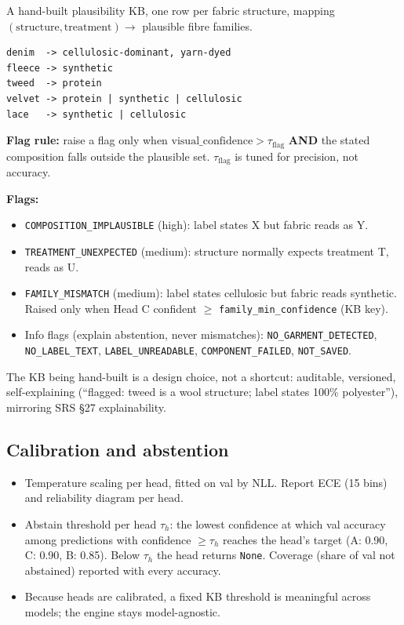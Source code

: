 \documentclass[11pt,a4paper]{article}
\begin{document}
A hand-built plausibility KB, one row per fabric structure, mapping
$(\text{structure}, \text{treatment}) \to$ plausible fibre families.

\begin{verbatim}
denim  -> cellulosic-dominant, yarn-dyed
fleece -> synthetic
tweed  -> protein
velvet -> protein | synthetic | cellulosic
lace   -> synthetic | cellulosic
\end{verbatim}

\textbf{Flag rule:} raise a flag only when $\text{visual\_confidence} > \tau_{\text{flag}}$
\textbf{AND} the stated composition falls outside the plausible set. $\tau_{\text{flag}}$
is tuned for precision, not accuracy.

\textbf{Flags:}
\begin{itemize}[leftmargin=*]
  \item \texttt{COMPOSITION\_IMPLAUSIBLE} (high): label states X but fabric reads as Y.
  \item \texttt{TREATMENT\_UNEXPECTED} (medium): structure normally expects treatment T, reads as U.
  \item \texttt{FAMILY\_MISMATCH} (medium): label states cellulosic but fabric reads synthetic.
        Raised only when Head C confident $\ge$ \texttt{family\_min\_confidence} (KB key).
  \item Info flags (explain abstention, never mismatches): \texttt{NO\_GARMENT\_DETECTED},
        \texttt{NO\_LABEL\_TEXT}, \texttt{LABEL\_UNREADABLE}, \texttt{COMPONENT\_FAILED},
        \texttt{NOT\_SAVED}.
\end{itemize}

The KB being hand-built is a design choice, not a shortcut: auditable, versioned,
self-explaining (``flagged: tweed is a wool structure; label states 100\%
polyester''), mirroring SRS \S 27 explainability.

\subsection{Calibration and abstention}

\begin{itemize}[leftmargin=*]
  \item Temperature scaling per head, fitted on val by NLL. Report ECE (15 bins) and
        reliability diagram per head.
  \item Abstain threshold per head $\tau_h$: the lowest confidence at which val
        accuracy among predictions with confidence $\ge \tau_h$ reaches the head's
        target (A: 0.90, C: 0.90, B: 0.85). Below $\tau_h$ the head returns
        \texttt{None}. Coverage (share of val not abstained) reported with every
        accuracy.
  \item Because heads are calibrated, a fixed KB threshold is meaningful across
        models; the engine stays model-agnostic.
\end{itemize}
\end{document}
